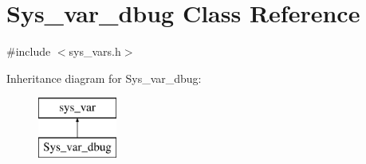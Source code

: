 \hypertarget{classSys__var__dbug}{}\section{Sys\+\_\+var\+\_\+dbug Class Reference}
\label{classSys__var__dbug}


{\ttfamily \#include $<$sys\+\_\+vars.\+h$>$}

Inheritance diagram for Sys\+\_\+var\+\_\+dbug\+:\begin{figure}[H]
\begin{center}
\leavevmode
\includegraphics[height=2.000000cm]{classSys__var__dbug}
\end{center}
\end{figure}

